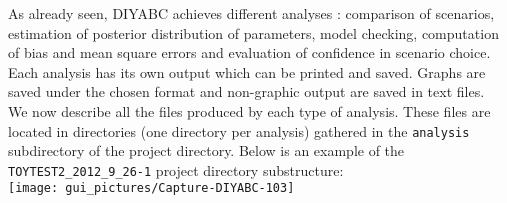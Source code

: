 As already seen, DIYABC achieves different analyses : comparison of
scenarios, estimation of posterior distribution of parameters, model
checking, computation of bias and mean square errors and evaluation
of confidence in scenario choice. Each analysis has its own output
which can be printed and saved. Graphs are saved under the chosen
format and non-graphic output are saved in text files.\\


We now describe all the files produced by each type of analysis. These
files are located in directories (one directory per analysis) gathered
in the \texttt{analysis} subdirectory of the project directory. Below
is an example of the \texttt{TOYTEST2\_2012\_9\_26-1} project directory
substructure:\\


\texttt{[image: gui\_pictures/Capture-DIYABC-103]}\\


